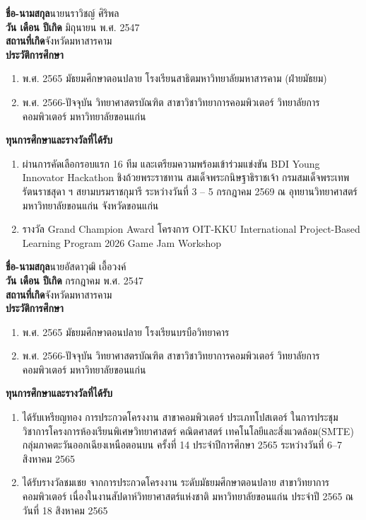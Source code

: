 
\noindent\textbf{ชื่อ-นามสกุล}\quad นายนราวิชญ์ ศิริพล\\
\textbf{วัน เดือน ปีเกิด} มิถุนายน พ.ศ. 2547\\
\textbf{สถานที่เกิด}\quad จังหวัดมหาสารคาม\\
\textbf{ประวัติการศึกษา}
\begin{enumerate}[noitemsep,topsep=0pt]
  \item พ.ศ. 2565 มัธยมศึกษาตอนปลาย โรงเรียนสาธิตมหาวิทยาลัยมหาสารคาม (ฝ่ายมัธยม)
  \item พ.ศ. 2566-ปัจจุบัน วิทยาศาสตรบัณฑิต สาขาวิชาวิทยาการคอมพิวเตอร์ วิทยาลัยการคอมพิวเตอร์ มหาวิทยาลัยขอนแก่น
\end{enumerate}
\noindent\textbf{ทุนการศึกษาและรางวัลที่ได้รับ}
\begin{enumerate}[noitemsep,topsep=0pt]
  \item ผ่านการคัดเลือกรอบแรก 16 ทีม และเตรียมความพร้อมเข้าร่วมแข่งขัน BDI Young Innovator Hackathon ชิงถ้วยพระราชทาน สมเด็จพระกนิษฐาธิราชเจ้า กรมสมเด็จพระเทพรัตนราชสุดา ฯ สยามบรมราชกุมารี ระหว่างวันที่ 3 -- 5 กรกฎาคม 2569 ณ อุทยานวิทยาศาสตร์ มหาวิทยาลัยขอนแก่น จังหวัดขอนแก่น
  \item รางวัล Grand Champion Award โครงการ OIT-KKU International Project-Based Learning Program 2026 Game Jam Workshop
\end{enumerate}

\vspace{0.8\baselineskip}

\noindent\textbf{ชื่อ-นามสกุล}\quad นายอัสดาวุฒิ เอื้อวงค์\\
\textbf{วัน เดือน ปีเกิด} กรกฎาคม พ.ศ. 2547\\
\textbf{สถานที่เกิด}\quad จังหวัดมหาสารคาม\\
\textbf{ประวัติการศึกษา}
\begin{enumerate}[noitemsep,topsep=0pt]
  \item พ.ศ. 2565 มัธยมศึกษาตอนปลาย โรงเรียนบรบือวิทยาคาร
  \item พ.ศ. 2566-ปัจจุบัน วิทยาศาสตรบัณฑิต สาขาวิชาวิทยาการคอมพิวเตอร์ วิทยาลัยการคอมพิวเตอร์ มหาวิทยาลัยขอนแก่น
\end{enumerate}
\noindent\textbf{ทุนการศึกษาและรางวัลที่ได้รับ}
\begin{enumerate}[noitemsep,topsep=0pt]
  \item ได้รับเหรียญทอง การประกวดโครงงาน สาขาคอมพิวเตอร์ ประเภทโปสเตอร์ ในการประชุมวิชาการโครงการห้องเรียนพิเศษวิทยาศาสตร์ คณิตศาสตร์ เทคโนโลยีและสิ่งแวดล้อม(SMTE) กลุ่มภาคตะวันออกเฉียงเหนือตอนบน ครั้งที่ 14 ประจำปีการศึกษา 2565 ระหว่างวันที่ 6--7 สิงหาคม 2565
  \item ได้รับรางวัลชมเชย จากการประกวดโครงงาน ระดับมัธยมศึกษาตอนปลาย สาขาวิทยาการคอมพิวเตอร์ เนื่องในงานสัปดาห์วิทยาศาสตร์แห่งชาติ มหาวิทยาลัยขอนแก่น ประจำปี 2565 ณ วันที่ 18 สิงหาคม 2565 
\end{enumerate}
